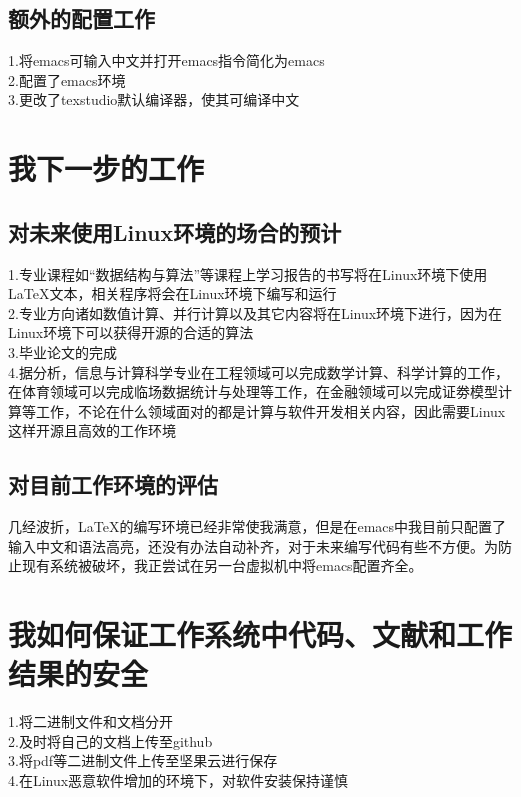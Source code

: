 \documentclass{ctexart}
\begin{document}
	\subsection{额外的配置工作}
	\begin{flushleft}
		1.将emacs可输入中文并打开emacs指令简化为emacs\\
		2.配置了emacs环境\\
		3.更改了texstudio默认编译器，使其可编译中文\\
	\end{flushleft}
	\section{我下一步的工作}
	\subsection{对未来使用Linux环境的场合的预计}
	\begin{flushleft}
		1.专业课程如“数据结构与算法”等课程上学习报告的书写将在Linux环境下使用\LaTeX{}文本，相关程序将会在Linux环境下编写和运行\\
		2.专业方向诸如数值计算、并行计算以及其它内容将在Linux环境下进行，因为在Linux环境下可以获得开源的合适的算法\\
		3.毕业论文的完成\\
		4.据分析，信息与计算科学专业在工程领域可以完成数学计算、科学计算的工作，在体育领域可以完成临场数据统计与处理等工作，在金融领域可以完成证劵模型计算等工作，不论在什么领域面对的都是计算与软件开发相关内容，因此需要Linux这样开源且高效的工作环境\cite{高泽健2020浅析信息与计算科学在几个领域中的应用}\\
	\end{flushleft}
	\subsection{对目前工作环境的评估}
	几经波折，\LaTeX{}的编写环境已经非常使我满意，但是在emacs中我目前只配置了输入中文和语法高亮，还没有办法自动补齐，对于未来编写代码有些不方便。为防止现有系统被破坏，我正尝试在另一台虚拟机中将emacs配置齐全。
	\section{我如何保证工作系统中代码、文献和工作结果的安全}
	\begin{flushleft}
		1.将二进制文件和文档分开\\
		2.及时将自己的文档上传至github\\
		3.将pdf等二进制文件上传至坚果云进行保存\\
		4.在Linux恶意软件增加的环境下，对软件安装保持谨慎\cite{崔丹1}\\
		
	\end{flushleft}
	


\end{document}
